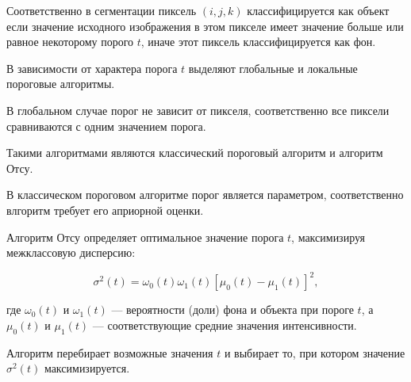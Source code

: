 Соответственно в сегментации пиксель \((i, j, k)\) классифицируется как объект если значение исходного изображения в этом пикселе имеет значение больше или равное некоторому порого \(t\), иначе этот пиксель классифицируется как фон.

В зависимости от характера порога \(t\) выделяют глобальные и локальные пороговые алгоритмы.

В глобальном случае порог не зависит от пикселя, соответственно все пиксели сравниваются с одним значением порога.

Такими алгоритмами являются классический пороговый алгоритм и алгоритм Отсу.

В классическом пороговом алгоритме порог является параметром, соответственно влгоритм требует его априорной оценки.

Алгоритм Отсу \cite{otsu1975threshold} определяет оптимальное значение порога \(t\), максимизируя межклассовую дисперсию:

\begin{equation}
    \sigma^2(t) = \omega_0(t) \omega_1(t) \left[ \mu_0(t) - \mu_1(t) \right]^2,
\end{equation}

где \(\omega_0(t)\) и \(\omega_1(t)\) — вероятности (доли) фона и объекта при пороге \(t\), а \(\mu_0(t)\) и \(\mu_1(t)\) — соответствующие средние значения интенсивности.

Алгоритм перебирает возможные значения \(t\) и выбирает то, при котором значение \(\sigma^2(t)\) максимизируется. 


